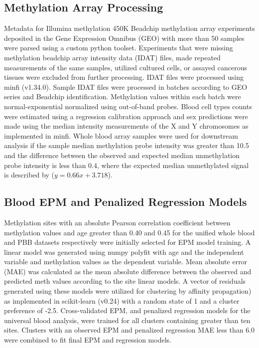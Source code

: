 \documentclass{article}
\begin{document}
{\begin{linenumbers}
\subsection{ Methylation Array Processing}

Metadata for Illumina methylation 450K Beadchip methylation array experiments deposited in the Gene Expression 
Omnibus (GEO) \cite{Barrett2012-gu} with more than 50 samples were parsed using a custom python toolset. Experiments 
that were missing methylation beadchip array intensity data (IDAT) files, made repeated measurements of the same 
samples, utilized cultured cells, or assayed cancerous tissues were excluded from further processing. IDAT files 
were processed using minfi\cite{Aryee2014-ky} (v1.34.0). Sample IDAT files were processed in batches according to 
GEO series and Beadchip  identification. Methylation values within each batch were normal-exponential normalized 
using out-of-band probes\cite{Triche2013-pp}. Blood cell types counts were estimated using a regression calibration 
approach\cite{Houseman2012-rr} and sex predictions were made using the median intensity measurements of the X and Y 
chromosomes as implemented in minfi\cite{Aryee2014-ky}. Whole blood array samples were used for downstream analysis 
if the sample median methylation probe intensity was greater than 10.5 and the difference between the observed and 
expected median unmethylation probe intensity is less than 0.4, where the expected median unmethylated signal is 
described by ($y=0.66x + 3.718$). 

\subsection{Blood EPM and Penalized Regression Models}

Methylation sites with an absolute Pearson correlation coefficient between methylation values and age greater than 
0.40 and 0.45 for the unified whole blood and PBB datasets respectively were initially selected for EPM model 
training. A linear model was generated using numpy polyfit \cite{Harris2020-yb} with age and the independent 
variable and methylation values as the dependent variable. Mean absolute error (MAE) was calculated as the mean 
absolute difference between the observed and predicted meth values according to the site linear models. A vector 
of residuals generated using these models were utilized for clustering by affinity propagation\cite{Frey2007-mu}) 
as implemented in scikit-learn (v0.24)\cite{Pedregosa2011-fi} with a random state of 1 and a cluster preference of 
-2.5. Cross-validated EPM, and penalized regression models for the universal blood analysis,  were trained for all 
clusters containing greater than ten sites. Clusters with an observed EPM and penalized regression MAE less than 6.0 
were combined to fit final EPM and regression models. 


\end{linenumbers}}
\end{document}
